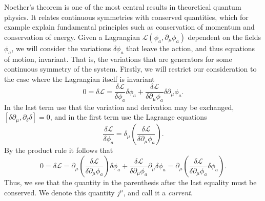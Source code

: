 Noether's theorem is one of the most central results in theoretical quantum physics.
It relates continuous symmetries with conserved quantities, which for example explain fundamental principles such as conservation of momentum and conservation of energy.
Given a Lagrangian $\mathcal{L}(\phi_a, \partial_{\mu}\phi_a)$ dependent on the fields $\phi_a$, we will consider the variations $\delta\phi_a$ that leave the action, and thus equations of motion, invariant.
That is, the variations that are generators for some continuous symmetry of the system.
Firstly, we will restrict our consideration to the case where the Lagrangian itself is invariant
\begin{equation}
  0 = \delta \mathcal{L} =
  \frac{\delta \mathcal{L}}{\delta \phi_a} \delta\phi_a + \frac{\delta \mathcal{L}}{\delta\partial_{\mu}\phi_a} \delta\partial_{\mu}\phi_a.
\end{equation}
In the last term use that the variation and derivation may be exchanged, $[\delta\partial_{\mu}, \partial_{\delta}\delta] = 0$, and in the first term use the Lagrange equations
\begin{equation}
  \label{eq:lagrange_eq}
  \frac{\delta \mathcal{L}}{\delta\phi_a} = \delta_{\mu} \left( \frac{\delta \mathcal{L}}{\delta \partial_{\mu}\phi_a} \right).
\end{equation}
By the product rule it follows that
\begin{equation}
  \label{eq:noether-1}
  0 = \delta \mathcal{L} =
  \partial_{\mu}\left( \frac{\delta \mathcal{L}}{\delta\partial_{\mu}\phi_a} \right) \delta \phi_a
  + \frac{\delta \mathcal{L}}{\delta\partial_{\mu}\phi_a} \partial_{\mu}\delta \phi_a
  = \partial_{\mu} \left( \frac{\delta \mathcal{L}}{\delta\partial_{\mu}\phi_a} \delta\phi_a \right).
\end{equation}
Thus, we see that the quantity in the parenthesis after the last equality must be conserved.
We denote this quantity $j^{\mu}$, and call it a \emph{current}.

